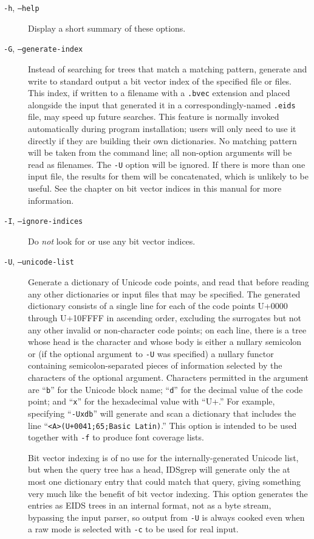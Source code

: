 \documentclass[twocolumn]{report}
\newcommand{\DangerousBend}{\marginpar{\large\hfill\dbend\hfill\null}}
\begin{document}
\begin{description}
\item[\texttt{-h}, \texttt{--help}] Display a short summary of these
options.

\item[\texttt{-G}, \texttt{--generate-index}]
Instead \DangerousBend of searching for trees that match a matching
pattern, generate and
write to standard output a bit vector index of the specified file or files.
This index, if written to a filename with a \texttt{.bvec} extension and
placed alongside the input that generated it in a correspondingly-named
\texttt{.eids} file, may speed up future searches.
This feature is normally invoked automatically during program installation;
users will only need to use it directly if they are building their own
dictionaries.  No
matching pattern will be taken from the command line; all non-option
arguments will be read as filenames.  The \texttt{-U} option will be
ignored.  If there is more than one input file, the results for them will be
concatenated, which is unlikely to be useful.  See the chapter on bit vector
indices in this manual for more information.

\item[\texttt{-I}, \texttt{--ignore-indices}]
Do \emph{not} look for or use any bit vector indices.

\item[\texttt{-U}, \texttt{--unicode-list}] Generate a dictionary of Unicode
code points, and read that before reading any other dictionaries or input
files that may be specified.  The generated dictionary consists of a single
line for each of the code points U+0000 through U+10FFFF in ascending order,
excluding the surrogates but not any other invalid or non-character code
points; on each line, there is a tree whose head is the character and whose
body is either a nullary semicolon or (if the optional argument to
\texttt{-U} was specified) a nullary functor containing semicolon-separated
pieces of information selected by the characters of the optional argument. 
Characters permitted in the argument are ``\texttt{b}'' for the Unicode
block name; ``\texttt{d}'' for the decimal value of the code point; and
``\texttt{x}'' for the hexadecimal value with ``U+.'' For example,
specifying ``\texttt{-Uxdb}'' will generate and scan a dictionary that
includes the line ``\texttt{<A>(U+0041;65;Basic Latin)}.'' This option is
intended to be used together with \texttt{-f} to produce font coverage
lists.

Bit \DangerousBend vector indexing is of no use for the internally-generated
Unicode list, but when the query tree has a head, IDSgrep will generate
only the at most one dictionary entry that could match that query, giving
something very much like the benefit of bit vector indexing.
This option generates the entries as EIDS trees in an internal format,
not as a byte stream, bypassing the input parser,
so output from \texttt{-U}
is always cooked even when a raw mode is selected with
\texttt{-c} to be used for real input.


\end{description}
\end{document}
